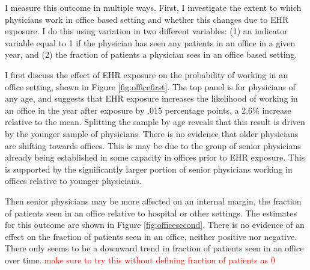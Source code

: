 \documentclass[11pt]{article}
\begin{document}
I measure this outcome in multiple ways. First, I investigate the extent to which physicians work in office based setting and whether this changes due to EHR exposure. I do this using variation in two different variables: (1) an indicator variable equal to 1 if the physician has seen any patients in an office in a given year, and (2) the fraction of patients a physician sees in an office based setting. 

I first discuss the effect of EHR exposure on the probability of working in an office setting, shown in Figure \ref{fig:officefirst}. The top panel is for physicians of any age, and suggests that EHR exposure increases the likelihood of working in an office in the year after exposure by .015 percentage points, a 2.6\% increase relative to the mean. Splitting the sample by age reveals that this result is driven by the younger sample of physicians. There is no evidence that older physicians are shifting towards offices. This is may be due to the group of senior physicians already being established in some capacity in offices prior to EHR exposure. This is supported by the significantly larger portion of senior physicians working in offices relative to younger physicians. 

Then senior physicians may be more affected on an internal margin, the fraction of patients seen in an office relative to hospital or other settings. The estimates for this outcome are shown in Figure \ref{fig:officesecond}. There is no evidence of an effect on the fraction of patients seen in an office, neither positive nor negative. There only seems to be a downward trend in fraction of patients seen in an office over time. \textcolor{red}{make sure to try this without defining fraction of patients as 0}
\end{document}
